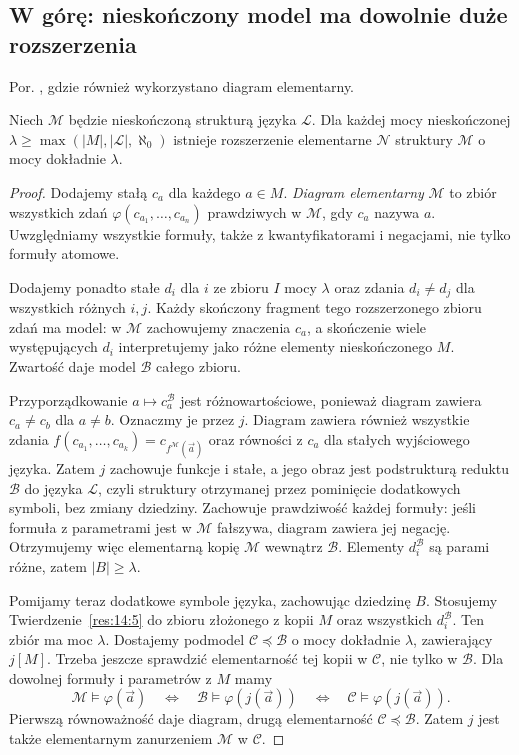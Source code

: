 \subsection*{W górę: nieskończony model ma dowolnie duże rozszerzenia}\label{sec:14:4}
Por. , gdzie również wykorzystano diagram elementarny.

\begin{twierdzenie}\label{res:14:9}
Niech $\mathcal M$ będzie nieskończoną strukturą języka $\mathcal L$. Dla każdej mocy nieskończonej $\lambda\ge\max(|M|,|\mathcal L|,\aleph_0)$ istnieje rozszerzenie elementarne $\mathcal N$ struktury $\mathcal M$ o mocy dokładnie $\lambda$.
\end{twierdzenie}
\begin{proof}
Dodajemy stałą $c_a$ dla każdego $a\in M$. \emph{Diagram elementarny} $\mathcal M$ to zbiór wszystkich zdań $\varphi(c_{a_1},\ldots,c_{a_n})$ prawdziwych w $\mathcal M$, gdy $c_a$ nazywa $a$. Uwzględniamy wszystkie formuły, także z kwantyfikatorami i negacjami, nie tylko formuły atomowe.

Dodajemy ponadto stałe $d_i$ dla $i$ ze zbioru $I$ mocy $\lambda$ oraz zdania $d_i\ne d_j$ dla wszystkich różnych $i,j$. Każdy skończony fragment tego rozszerzonego zbioru zdań ma model: w $\mathcal M$ zachowujemy znaczenia $c_a$, a skończenie wiele występujących $d_i$ interpretujemy jako różne elementy nieskończonego $M$. Zwartość daje model $\mathcal B$ całego zbioru.

Przyporządkowanie $a\mapsto c_a^{\mathcal B}$ jest różnowartościowe, ponieważ diagram zawiera $c_a\ne c_b$ dla $a\ne b$. Oznaczmy je przez $j$. Diagram zawiera również wszystkie zdania $f(c_{a_1},\ldots,c_{a_k})=c_{f^{\mathcal M}(\vec a)}$ oraz równości z $c_{a}$ dla stałych wyjściowego języka. Zatem $j$ zachowuje funkcje i stałe, a jego obraz jest podstrukturą reduktu $\mathcal B$ do języka $\mathcal L$, czyli struktury otrzymanej przez pominięcie dodatkowych symboli, bez zmiany dziedziny. Zachowuje prawdziwość każdej formuły: jeśli formuła z parametrami jest w $\mathcal M$ fałszywa, diagram zawiera jej negację. Otrzymujemy więc elementarną kopię $\mathcal M$ wewnątrz $\mathcal B$. Elementy $d_i^{\mathcal B}$ są parami różne, zatem $|B|\ge\lambda$.

Pomijamy teraz dodatkowe symbole języka, zachowując dziedzinę $B$. Stosujemy Twierdzenie~\ref{res:14:5} do zbioru złożonego z kopii $M$ oraz wszystkich $d_i^{\mathcal B}$. Ten zbiór ma moc $\lambda$. Dostajemy podmodel $\mathcal C\preccurlyeq\mathcal B$ o mocy dokładnie $\lambda$, zawierający $j[M]$. Trzeba jeszcze sprawdzić elementarność tej kopii w $\mathcal C$, nie tylko w $\mathcal B$. Dla dowolnej formuły i parametrów z $M$ mamy
\[
\mathcal M\models\varphi(\vec a)\quad\Longleftrightarrow\quad
\mathcal B\models\varphi(j(\vec a))\quad\Longleftrightarrow\quad
\mathcal C\models\varphi(j(\vec a)).
\]
Pierwszą równoważność daje diagram, drugą elementarność $\mathcal C\preccurlyeq\mathcal B$. Zatem $j$ jest także elementarnym zanurzeniem $\mathcal M$ w $\mathcal C$.


\end{proof}
